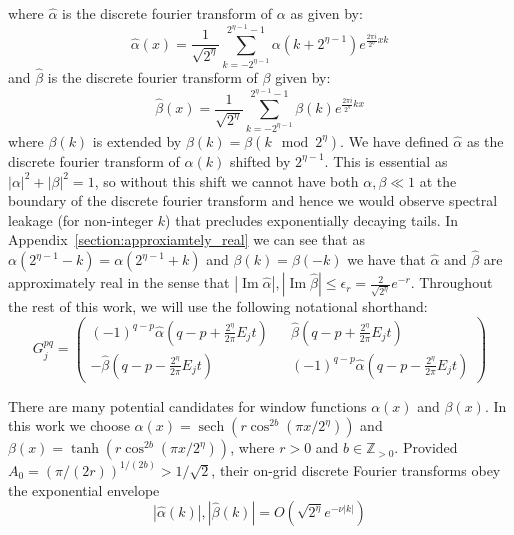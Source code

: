 \documentclass[aps,floatfix,10pt,amssymb,amsfont,amsmath,superscriptaddress,float,nofootinbib,longbibliography,nobalancelastpage,twocolumn]{revtex4-2}
\begin{document}
\begin{widetext}
where $\hat \alpha$ is the discrete fourier transform of $\alpha$ as given by:
\begin{equation}
   \hat\alpha(x) =\frac{1}{\sqrt{2^{\eta}}}\sum_{k=-2^{\eta-1}}^{2^{\eta-1}-1} \alpha(k+2^{\eta-1})e^{\frac{2\pi i}{2^{\eta}}xk}
\end{equation}
and $\hat \beta$ is the discrete fourier transform of $\beta$ given by:
\begin{equation}
    \hat\beta(x) =\frac{1}{\sqrt{2^{\eta}}}\sum_{k=-2^{\eta-1}}^{2^{\eta-1}-1} \beta(k)e^{\frac{2\pi i}{2^{\eta}}kx}
\end{equation}
 where $\beta(k)$ is extended by $\beta(k) = \beta(k \mod 2^{\eta})$. We have defined $\hat \alpha$ as the discrete fourier transform of $\alpha(k)$ shifted by $2^{\eta-1}$. This is essential as $|\alpha|^2+|\beta|^2=1$, so without this shift we cannot have both $\alpha, \beta \ll1$ at the boundary of the discrete fourier transform and hence we would observe spectral leakage (for non-integer $k$) that precludes exponentially decaying tails. In Appendix~\ref{section:approxiamtely_real} we can see that as $\alpha(2^{\eta-1} - k) = \alpha(2^{\eta-1}+k)$ and $\beta(k) = \beta(-k)$ we have that $\hat \alpha$ and $\hat \beta$ are approximately real in the sense that $|\operatorname{Im}\hat \alpha|,|\operatorname{Im}\hat \beta| \leq \epsilon_r = \frac{2}{\sqrt{2^{\eta}}}e^{-r}$. Throughout the rest of this work, we will use the following notational shorthand: 
\begin{equation}
    G_j^{pq} = \begin{pmatrix}
        (-1)^{q-p}\hat\alpha(q-p+\frac{2^{\eta}}{2\pi}E_jt) && \hat\beta(q-p+\frac{2^{\eta}}{2\pi}E_jt)\\
        -\hat\beta (q-p-\frac{2^{\eta}}{2\pi}E_jt) && (-1)^{q-p}\hat\alpha(q-p-\frac{2^{\eta}}{2\pi}E_jt)
    \end{pmatrix}
\end{equation}
\end{widetext}
There are many potential candidates for window functions $\alpha(x)$ and $\beta(x)$. In this work we choose $\alpha(x)=\operatorname{sech}(r\cos^{2b}(\pi x/2^{\eta}))$ and $\beta(x)=\operatorname{tanh}(r\cos^{2b}(\pi x/2^{\eta}))$, where $r>0$ and $b\in\mathbb{Z}_{>0}$. Provided
$A_0=(\pi/(2r))^{1/(2b)}>1/\sqrt2$, their on-grid discrete Fourier
transforms obey the exponential envelope
\begin{equation}
    |\hat \alpha(k)|,|\hat \beta(k)| = O\left( \sqrt{2^{\eta}}e^{-\nu |k|}\right)
    \label{eq:scaling}
\end{equation}
\end{document}
